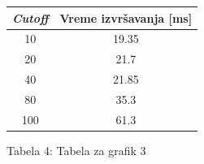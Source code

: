 \documentclass[12pt, a4paper]{article}
\begin{document}
	\begin{center}
		\begin{tabular}{||c c ||} 
			\hline
			\textit{Cutoff} & Vreme izvršavanja [ms]\\ [0.5ex] 
			\hline\hline
			10 & 19.35 \\ 
			\hline
			20 & 21.7 \\
			\hline
			40 & 21.85 \\
			\hline
			80 & 35.3 \\
			\hline
			100 & 61.3 \\
			\hline
		\end{tabular}
	\end{center}
	\begin{center}
		Tabela 4: Tabela za grafik 3
	\end{center}
		
	
\end{document}
